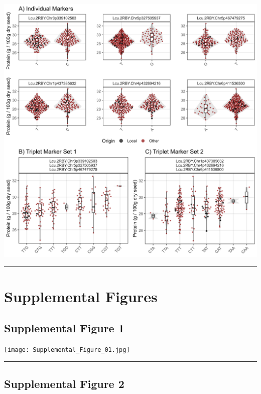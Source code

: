 \documentclass[
]{article}
\begin{document}
\includegraphics{Figure_05d.jpg}

\begin{center}\rule{0.5\linewidth}{0.5pt}\end{center}

\hypertarget{supplemental-figures}{%
\section{Supplemental Figures}\label{supplemental-figures}}

\hypertarget{supplemental-figure-1}{%
\subsection{Supplemental Figure 1}\label{supplemental-figure-1}}

\texttt{[image: Supplemental\_Figure\_01.jpg]}

\begin{center}\rule{0.5\linewidth}{0.5pt}\end{center}

\hypertarget{supplemental-figure-2}{%
\subsection{Supplemental Figure 2}\label{supplemental-figure-2}}
\end{document}

